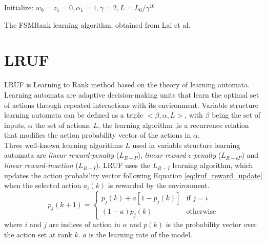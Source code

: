 \LinesNumbered
\begin{algorithm}[H]
 Initialize: $w_0=z_1=0, \alpha_1=1, \gamma=2, L=L_0/\gamma^{10}$\\
 
 \caption{The FSMRank learning algorithm, obtained from Lai et al. \cite{Lai2013c}}
 \label{alg:fsmrank}
\end{algorithm}

\section{LRUF}
LRUF \cite{Torkestani2012b} is Learning to Rank method based on the theory of learning automata. Learning automata are adaptive decision-making units that learn the optimal set of actions through repeated interactions with its environment. Variable structure learning automata can be defined as a triple $<\beta,\alpha,L>$, with $\beta$ being the set of inputs, $\alpha$ the set of actions. $L$, the learning algorithm ,is a recurrence relation that modifies the action probability vector of the actions in $\alpha$.\\

Three well-known learning algorithms $L$ used in variable structure learning automata are \emph{linear reward-penalty} ($L_{R-P}$), \emph{linear reward-$\epsilon$-penalty} ($L_{R-\epsilon P}$) and \emph{linear reward-inaction} ($L_{R-I}$). LRUF uses the $L_{R-I}$ learning algorithm, which updates the action probability vector following Equation \ref{eq:lruf_reward_update} when the selected action $a_i(k)$ is rewarded by the environment.
\begin{equation}
p_j(k+1)=	\begin{cases}	p_j(k)+a[1-p_j(k)] 	&\mbox{if } j=i \\ 
							(1-a)p_j(k) 		&\mbox{otherwise} 
			\end{cases} 
\label{eq:lruf_reward_update}
\end{equation}
\noindent where $i$ and $j$ are indices of action in $\alpha$ and $p(k)$ is the probability vector over the action set at rank $k$. $a$ is the learning rate of the model.\\

